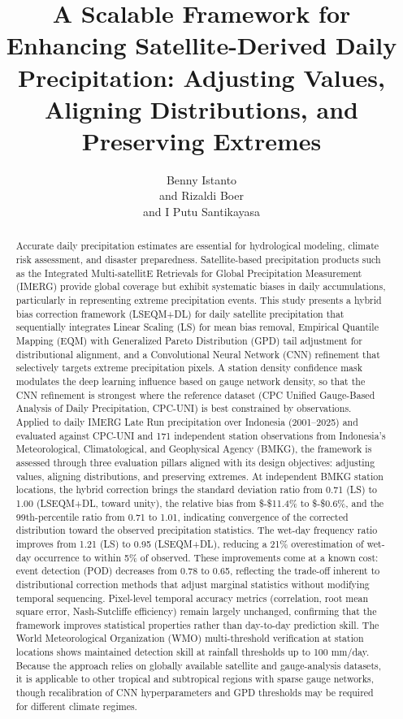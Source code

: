 \documentclass[
]{article}
\title{A Scalable Framework for Enhancing Satellite-Derived Daily Precipitation: Adjusting Values, Aligning Distributions, and Preserving Extremes}
\author{Benny Istanto \\and Rizaldi Boer \\and I Putu Santikayasa}
\date{}
\begin{document}
\maketitle


\begin{abstract}

Accurate daily precipitation estimates are essential for hydrological
modeling, climate risk assessment, and disaster preparedness.
Satellite-based precipitation products such as the Integrated
Multi-satellitE Retrievals for Global Precipitation Measurement (IMERG)
provide global coverage but exhibit systematic biases in daily
accumulations, particularly in representing extreme precipitation
events. This study presents a hybrid bias correction framework
(LSEQM+DL) for daily satellite precipitation that sequentially
integrates Linear Scaling (LS) for mean bias removal, Empirical Quantile
Mapping (EQM) with Generalized Pareto Distribution (GPD) tail adjustment
for distributional alignment, and a Convolutional Neural Network (CNN)
refinement that selectively targets extreme precipitation pixels. A
station density confidence mask modulates the deep learning influence
based on gauge network density, so that the CNN refinement is strongest
where the reference dataset (CPC Unified Gauge-Based Analysis of Daily
Precipitation, CPC-UNI) is best constrained by observations. Applied to
daily IMERG Late Run precipitation over Indonesia (2001--2025) and
evaluated against CPC-UNI and 171 independent station observations from
Indonesia's Meteorological, Climatological, and Geophysical Agency
(BMKG), the framework is assessed through three evaluation pillars
aligned with its design objectives: adjusting values, aligning
distributions, and preserving extremes. At independent BMKG station
locations, the hybrid correction brings the standard deviation ratio
from 0.71 (LS) to 1.00 (LSEQM+DL, toward unity), the relative bias from
\$-\$11.4\% to \$-\$0.6\%, and the 99th-percentile ratio from 0.71 to
1.01, indicating convergence of the corrected distribution toward the
observed precipitation statistics. The wet-day frequency ratio improves
from 1.21 (LS) to 0.95 (LSEQM+DL), reducing a 21\% overestimation of
wet-day occurrence to within 5\% of observed. These improvements come at
a known cost: event detection (POD) decreases from 0.78 to 0.65,
reflecting the trade-off inherent to distributional correction methods
that adjust marginal statistics without modifying temporal sequencing.
Pixel-level temporal accuracy metrics (correlation, root mean square
error, Nash-Sutcliffe efficiency) remain largely unchanged, confirming
that the framework improves statistical properties rather than
day-to-day prediction skill. The World Meteorological Organization (WMO)
multi-threshold verification at station locations shows maintained
detection skill at rainfall thresholds up to 100 mm/day. Because the
approach relies on globally available satellite and gauge-analysis
datasets, it is applicable to other tropical and subtropical regions
with sparse gauge networks, though recalibration of CNN hyperparameters
and GPD thresholds may be required for different climate regimes.


\end{abstract}
\end{document}
